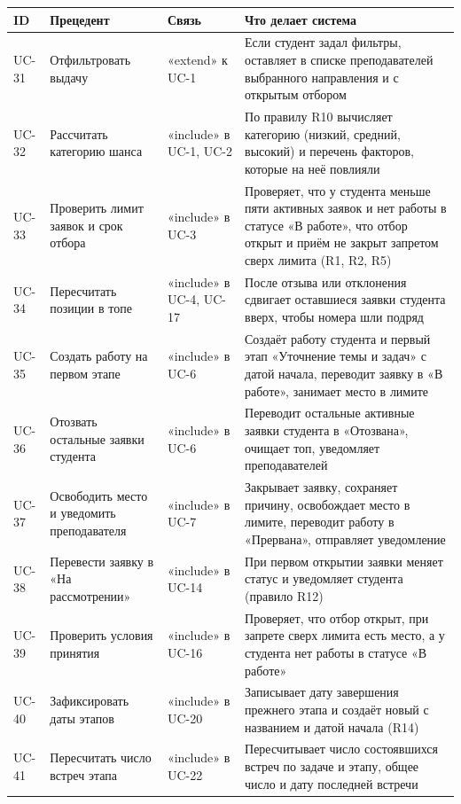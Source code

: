 \documentclass[a4paper,12pt]{article}
\begin{document}
\begin{center}
\small
\begin{longtable}{|l|p{3.6cm}|p{2.6cm}|p{6.2cm}|}
\hline
\textbf{ID} & \textbf{Прецедент} & \textbf{Связь} & \textbf{Что делает система}\\ \hline
\endhead
UC-31 & Отфильтровать выдачу & «extend» к UC-1 & Если студент задал фильтры, оставляет в списке преподавателей выбранного направления и с открытым отбором\\ \hline
UC-32 & Рассчитать категорию шанса & «include» в UC-1, UC-2 & По правилу R10 вычисляет категорию (низкий, средний, высокий) и перечень факторов, которые на неё повлияли\\ \hline
UC-33 & Проверить лимит заявок и срок отбора & «include» в UC-3 & Проверяет, что у студента меньше пяти активных заявок и нет работы в статусе «В работе», что отбор открыт и приём не закрыт запретом сверх лимита (R1, R2, R5)\\ \hline
UC-34 & Пересчитать позиции в топе & «include» в UC-4, UC-17 & После отзыва или отклонения сдвигает оставшиеся заявки студента вверх, чтобы номера шли подряд\\ \hline
UC-35 & Создать работу на первом этапе & «include» в UC-6 & Создаёт работу студента и первый этап «Уточнение темы и задач» с датой начала, переводит заявку в «В работе», занимает место в лимите\\ \hline
UC-36 & Отозвать остальные заявки студента & «include» в UC-6 & Переводит остальные активные заявки студента в «Отозвана», очищает топ, уведомляет преподавателей\\ \hline
UC-37 & Освободить место и уведомить преподавателя & «include» в UC-7 & Закрывает заявку, сохраняет причину, освобождает место в лимите, переводит работу в «Прервана», отправляет уведомление\\ \hline
UC-38 & Перевести заявку в «На рассмотрении» & «include» в UC-14 & При первом открытии заявки меняет статус и уведомляет студента (правило R12)\\ \hline
UC-39 & Проверить условия принятия & «include» в UC-16 & Проверяет, что отбор открыт, при запрете сверх лимита есть место, а у студента нет работы в статусе «В работе»\\ \hline
UC-40 & Зафиксировать даты этапов & «include» в UC-20 & Записывает дату завершения прежнего этапа и создаёт новый с названием и датой начала (R14)\\ \hline
UC-41 & Пересчитать число встреч этапа & «include» в UC-22 & Пересчитывает число состоявшихся встреч по задаче и этапу, общее число и дату последней встречи\\ \hline

\end{longtable}
\end{center}
\end{document}
